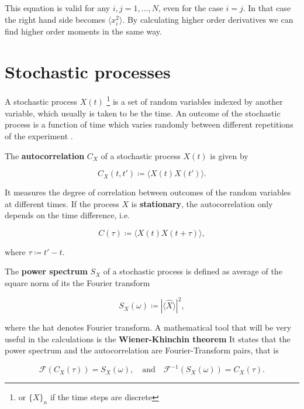 This equation is valid for any $i,j=1,\dotsc,N$, even for the case $i=j$. In that case the right hand side becomes $\langle x_i^2\rangle$. By calculating higher order derivatives we can find higher order moments in the same way.
  
\section{Stochastic processes}

A stochastic process $X(t)$ \footnote{or $\{X\}_n$ if the time steps are discrete} is a set of random variables indexed by another variable, which usually is taken to be the time. An outcome of the stochastic process is a function of time which varies randomly between different repetitions of the experiment \cite{vankampen92} \cite{gardiner03}.

The \textbf{autocorrelation} $C_X$ of a stochastic process $X(t)$ is given by

\begin{equation*}
  C_X(t,t') \coloneqq \langle X(t)X(t')\rangle.
\end{equation*}

It measures the degree of correlation between outcomes of the random variables at different times. If the process $X$ is \textbf{stationary}, the autocorrelation only depends on the time difference, i.e.

\begin{equation*}
  C(\tau) \coloneqq \langle X(t)X(t+\tau)\rangle,
\end{equation*}

where $\tau \coloneqq t'-t$.

The \textbf{power spectrum} $S_X$ of a stochastic process is defined as average of the square norm of its the Fourier transform

\begin{equation*}
  S_X(\omega) \coloneqq \left|\langle\hat X\rangle\right|^2,
\end{equation*}

where the hat denotes Fourier transform. A mathematical tool that will be very useful in the calculations is the \textbf{Wiener-Khinchin theorem} It states that the power spectrum and the autocorrelation are Fourier-Transform pairs, that is

\begin{equation*}
  \mathscr{F}(C_X(\tau)) = S_X(\omega),\quad\text{and}\quad \mathscr{F}^{-1}(S_X(\omega)) = C_X(\tau).
\end{equation*}

